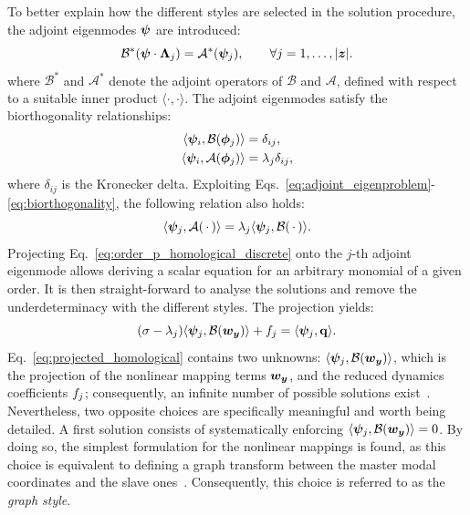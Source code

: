 \documentclass[%
reprint,
superscriptaddress,
 amsmath,amssymb,
 aps,
 pre
]{revtex4-2}
\begin{document}
To better explain how the different styles are selected in the solution procedure, the adjoint eigenmodes $\boldsymbol{\psi}$ are introduced:
\begin{equation}
\label{eq:adjoint_eigenproblem}
    \mathcal{B}^* (\boldsymbol{\psi} \cdot \boldsymbol{\Lambda}_{j}) = \mathcal{A}^* (\boldsymbol{\psi}_j), \qquad \forall j = 1,\ldots,|{\boldsymbol{z}}|.
\end{equation}
where $\mathcal{B}^*$ and $\mathcal{A}^*$ denote the adjoint operators of $\mathcal{B}$ and $\mathcal{A}$, defined with respect to a suitable inner product $\langle \cdot, \cdot \rangle$.
The adjoint eigenmodes satisfy the biorthogonality relationships:
\begin{subequations}
\label{eq:biorthogonality}
\begin{align}
    \langle \boldsymbol{\psi}_i, \mathcal{B} (\boldsymbol{\phi}_j) \rangle &= \delta_{ij},\\
    \langle \boldsymbol{\psi}_i, \mathcal{A}(\boldsymbol{\phi}_j) \rangle &=  \lambda_j \delta_{ij},
\end{align}
\end{subequations}
where $\delta_{ij}$ is the Kronecker delta. Exploiting Eqs.~\eqref{eq:adjoint_eigenproblem}-\eqref{eq:biorthogonality}, the following relation also holds:
\begin{equation}
    \langle \boldsymbol{\psi}_j, \mathcal{A}(\, \cdot \,) \rangle = \lambda_j \langle \boldsymbol{\psi}_j, \mathcal{B} (\, \cdot \,) \rangle.
\end{equation}
Projecting Eq.~\eqref{eq:order_p_homological_discrete} onto the $j$-th adjoint eigenmode allows deriving a scalar equation for an arbitrary monomial of a given order. It is then straight-forward to analyse the solutions and remove the underdeterminacy with the different styles. The projection yields:
\begin{equation}
\label{eq:projected_homological}
    (\sigma - \lambda_j) \langle \boldsymbol{\psi}_j, \mathcal{B} (\boldsymbol{w}_{{\boldsymbol{y}}}) \rangle + f_j = \langle \boldsymbol{\psi}_j, \mathbf{q} \rangle.
\end{equation} 
Eq.~\eqref{eq:projected_homological} contains two unknowns: $\langle \boldsymbol{\psi}_j, \mathcal{B} (\boldsymbol{w}_{{\boldsymbol{y}}}) \rangle$, which is the projection of the nonlinear mapping terms $\boldsymbol{w}_{{\boldsymbol{y}}}$, and the reduced dynamics coefficients $f_j$; consequently, an infinite number of possible solutions exist~\cite{Haro}. Nevertheless, two opposite choices are specifically meaningful and worth being detailed. A first solution consists of systematically enforcing $\langle \boldsymbol{\psi}_j, \mathcal{B} (\boldsymbol{w}_{{\boldsymbol{y}}}) \rangle = 0$. By doing so, the simplest formulation for the nonlinear mappings is found, as this choice is equivalent to defining a graph transform between the master modal coordinates and the slave ones~\cite{Haro,TouzeCISM2}. Consequently, this choice is referred to as the {\it graph style}.
\end{document}
